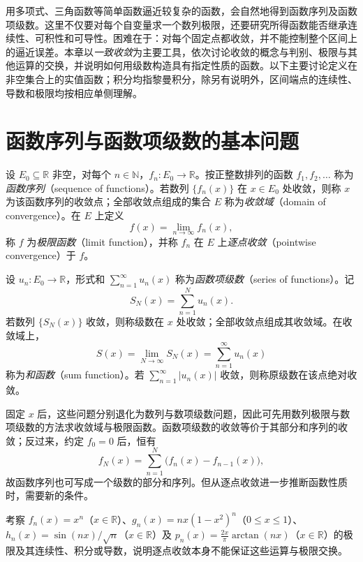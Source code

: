 \documentclass[UTF8,12pt,a4paper,fontset=fandol]{ctexbook}
\begin{document}
用多项式、三角函数等简单函数逼近较复杂的函数，会自然地得到函数序列及函数项级数。这里不仅要对每个自变量求一个数列极限，还要研究所得函数能否继承连续性、可积性和可导性。困难在于：对每个固定点都收敛，并不能控制整个区间上的逼近误差。本章以\emph{一致收敛}为主要工具，依次讨论收敛的概念与判别、极限与其他运算的交换，并说明如何用级数构造具有指定性质的函数。以下主要讨论定义在非空集合上的实值函数；积分均指黎曼积分，除另有说明外，区间端点的连续性、导数和极限均按相应单侧理解。

\section{函数序列与函数项级数的基本问题}
\label{sec:basic-problems-of-function-sequences-and-series}

\begin{definition}
\label{def:pointwise-function-sequence-convergence}
设 $E_0\subseteq\mathbb R$ 非空，对每个 $n\in\mathbb N$，$f_n:E_0\to\mathbb R$。按正整数排列的函数 $f_1,f_2,\ldots$ 称为\emph{函数序列}（sequence of functions）。若数列 $\{f_n(x)\}$ 在 $x\in E_0$ 处收敛，则称 $x$ 为该函数序列的收敛点；全部收敛点组成的集合 $E$ 称为\emph{收敛域}（domain of convergence）。在 $E$ 上定义
\[
    f(x)=\lim_{n\to\infty}f_n(x),
\]
称 $f$ 为\emph{极限函数}（limit function），并称 $f_n$ 在 $E$ 上\emph{逐点收敛}（pointwise convergence）于 $f$。
\end{definition}

\begin{definition}
\label{def:function-series-and-sum-function}
设 $u_n:E_0\to\mathbb R$，形式和 $\sum_{n=1}^\infty u_n(x)$ 称为\emph{函数项级数}（series of functions）。记
\[
    S_N(x)=\sum_{n=1}^N u_n(x).
\]
若数列 $\{S_N(x)\}$ 收敛，则称级数在 $x$ 处收敛；全部收敛点组成其收敛域。在收敛域上，
\[
    S(x)=\lim_{N\to\infty}S_N(x)=\sum_{n=1}^\infty u_n(x)
\]
称为\emph{和函数}（sum function）。若 $\sum_{n=1}^\infty|u_n(x)|$ 收敛，则称原级数在该点绝对收敛。
\end{definition}

固定 $x$ 后，这些问题分别退化为数列与数项级数问题，因此可先用数列极限与数项级数的方法求收敛域与极限函数。函数项级数的收敛等价于其部分和序列的收敛；反过来，约定 $f_0=0$ 后，恒有
\[
    f_N(x)=\sum_{n=1}^N\bigl(f_n(x)-f_{n-1}(x)\bigr),
\]
故函数序列也可写成一个级数的部分和序列。但从逐点收敛进一步推断函数性质时，需要新的条件。

\begin{example}
\label{ex:pointwise-limits-and-operation-failures}
考察 $f_n(x)=x^n$（$x\in\mathbb R$）、$g_n(x)=nx(1-x^2)^n$（$0\leq x\leq1$）、$h_n(x)=\sin(nx)/\sqrt n$（$x\in\mathbb R$）及 $p_n(x)=\frac{2x}{\pi}\arctan(nx)$（$x\in\mathbb R$）的极限及其连续性、积分或导数，说明逐点收敛本身不能保证这些运算与极限交换。
\end{example}
\end{document}
